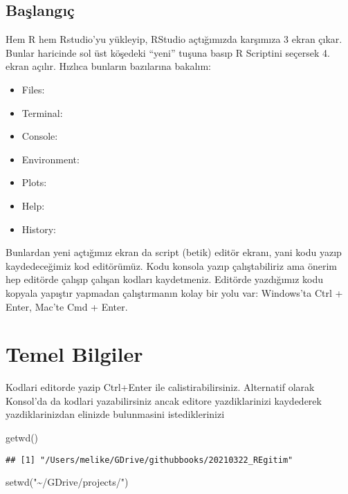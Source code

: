 \documentclass[
]{book}
\newenvironment{Shaded}{\begin{snugshade}}{\end{snugshade}}
\newcommand{\FunctionTok}[1]{\textcolor[rgb]{0.00,0.00,0.00}{#1}}
\newcommand{\NormalTok}[1]{#1}
\newcommand{\StringTok}[1]{\textcolor[rgb]{0.31,0.60,0.02}{#1}}
\providecommand{\tightlist}{%
  \setlength{\itemsep}{0pt}\setlength{\parskip}{0pt}}
\begin{document}
\hypertarget{baux15flangux131uxe7}{%
\section{Başlangıç}\label{baux15flangux131uxe7}}

Hem R hem Rstudio'yu yükleyip, RStudio açtığımızda karşımıza 3 ekran çıkar. Bunlar haricinde sol üst köşedeki ``yeni'' tuşuna basıp R Scriptini seçersek 4. ekran açılır. Hızlıca bunların bazılarına bakalım:

\begin{itemize}
\tightlist
\item
  Files:
\item
  Terminal:
\item
  Console:
\item
  Environment:
\item
  Plots:
\item
  Help:
\item
  History:
\end{itemize}

Bunlardan yeni açtığımız ekran da script (betik) editör ekranı, yani kodu yazıp kaydedeceğimiz kod editörümüz. Kodu konsola yazıp çalıştabiliriz ama önerim hep editörde çalışıp çalışan kodları kaydetmeniz. Editörde yazdığımız kodu kopyala yapıştır yapmadan çalıştırmanın kolay bir yolu var: Windows'ta Ctrl + Enter, Mac'te Cmd + Enter.

\hypertarget{temel-bilgiler}{%
\chapter{Temel Bilgiler}\label{temel-bilgiler}}

Kodlari editorde yazip Ctrl+Enter ile calistirabilirsiniz. Alternatif olarak Konsol'da da kodlari yazabilirsiniz ancak editore yazdiklarinizi kaydederek yazdiklarinizdan elinizde bulunmasini istediklerinizi

\begin{Shaded}
\begin{Highlighting}[]
\FunctionTok{getwd}\NormalTok{()}
\end{Highlighting}
\end{Shaded}

\begin{verbatim}
## [1] "/Users/melike/GDrive/githubbooks/20210322_REgitim"
\end{verbatim}

\begin{Shaded}
\begin{Highlighting}[]
\FunctionTok{setwd}\NormalTok{(}\StringTok{"\textasciitilde{}/GDrive/projects/"}\NormalTok{)}
\end{Highlighting}
\end{Shaded}
\end{document}
